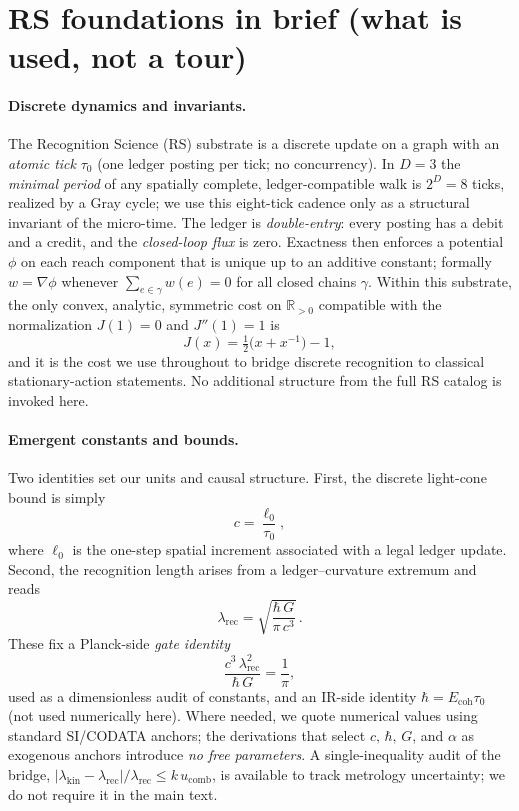 \documentclass[11pt]{article}
\begin{document}
\section{RS foundations in brief (what is used, not a tour)}

\paragraph{Discrete dynamics and invariants.} 
The Recognition Science (RS) substrate is a discrete update on a graph with an \emph{atomic tick} $\tau_0$ (one ledger posting per tick; no concurrency). In $D{=}3$ the \emph{minimal period} of any spatially complete, ledger-compatible walk is $2^D{=}8$ ticks, realized by a Gray cycle; we use this eight-tick cadence only as a structural invariant of the micro-time. The ledger is \emph{double-entry}: every posting has a debit and a credit, and the \emph{closed-loop flux} is zero. Exactness then enforces a potential $\phi$ on each reach component that is unique up to an additive constant; formally $w=\nabla\phi$ whenever $\sum_{e\in\gamma}w(e)=0$ for all closed chains $\gamma$. Within this substrate, the only convex, analytic, symmetric cost on $\mathbb{R}_{>0}$ compatible with the normalization $J(1)=0$ and $J''(1)=1$ is
\[
J(x)=\tfrac{1}{2}\bigl(x+x^{-1}\bigr)-1,
\]
and it is the cost we use throughout to bridge discrete recognition to classical stationary-action statements. No additional structure from the full RS catalog is invoked here.

\medskip

\paragraph{Emergent constants and bounds.} 
Two identities set our units and causal structure. First, the discrete light-cone bound is simply
\[
c=\frac{\ell_0}{\tau_0},
\]
where $\ell_0$ is the one-step spatial increment associated with a legal ledger update. Second, the recognition length arises from a ledger–curvature extremum and reads
\[
\lambda_{\mathrm{rec}}=\sqrt{\frac{\hbar\,G}{\pi\,c^3}}\,.
\]
These fix a Planck-side \emph{gate identity}
\[
\frac{c^3\,\lambda_{\mathrm{rec}}^2}{\hbar\,G}=\frac{1}{\pi},
\]
used as a dimensionless audit of constants, and an IR-side identity $\hbar=E_{\mathrm{coh}}\tau_0$ (not used numerically here). Where needed, we quote numerical values using standard SI/CODATA anchors; the derivations that select $c,\,\hbar,\,G$, and $\alpha$ as exogenous anchors introduce \emph{no free parameters}. A single-inequality audit of the bridge, $|\lambda_{\mathrm{kin}}-\lambda_{\mathrm{rec}}|/\lambda_{\mathrm{rec}}\leq k\,u_{\mathrm{comb}}$, is available to track metrology uncertainty; we do not require it in the main text.
\end{document}
